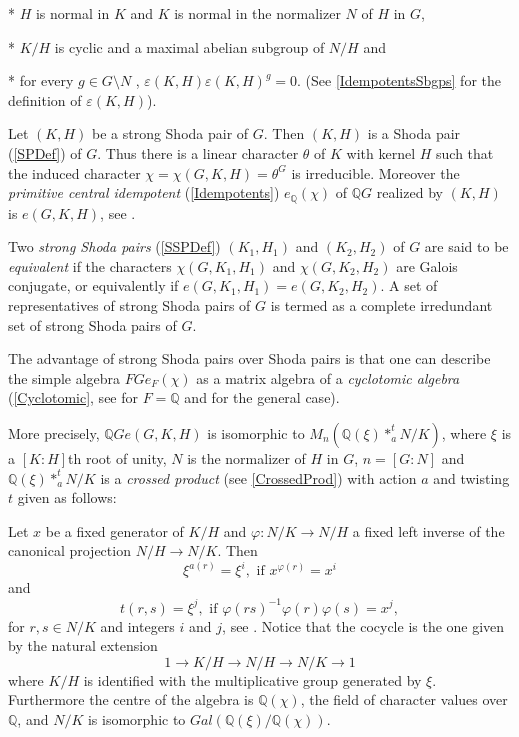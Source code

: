 \documentclass[a4paper,11pt]{report}
\begin{document}
{{ * $H$ is normal in $K$ and $K$ is normal in the normalizer $N$ of $H$ in $G$, 

 * $K/H$ is cyclic and a maximal abelian subgroup of $N/H$ and 

 * for every $g \in G\setminus N$ , $\varepsilon(K,H)\varepsilon(K,H)^g=0$. (See \ref{IdempotentsSbgps} for the definition of $\varepsilon(K,H)$). 

 Let $(K,H)$ be a strong Shoda pair of $G$. Then $(K,H)$ is a Shoda pair (\ref{SPDef}) of $G$. Thus there is a linear character $\theta$ of $K$ with kernel $H$ such that the induced character $\chi=\chi(G,K,H)=\theta^G$ is irreducible. Moreover the \emph{primitive central idempotent} (\ref{Idempotents}) $e_{{\ensuremath{\mathbb Q}} }(\chi)$ of ${\ensuremath{\mathbb Q}} G$ realized by $(K,H)$ is $e(G,K,H)$, see \cite{ORS}. 

  Two \emph{strong Shoda pairs} (\ref{SSPDef}) $(K_1,H_1)$ and $(K_2,H_2)$ of $G$ are said to be \emph{equivalent} if the characters $\chi(G,K_1,H_1)$ and $\chi(G,K_2,H_2)$ are Galois conjugate, or equivalently if $e(G,K_1,H_1)=e(G,K_2,H_2)$. A set of representatives of strong Shoda pairs of $G$ is termed as a complete irredundant set of strong Shoda pairs of $G$. 

 The advantage of strong Shoda pairs over Shoda pairs is that one can describe
the simple algebra $FGe_F(\chi)$ as a matrix algebra of a \emph{cyclotomic algebra} (\ref{Cyclotomic}, see \cite{ORS} for $F={\ensuremath{\mathbb Q}} $ and \cite{O} for the general case). 

 More precisely, ${\ensuremath{\mathbb Q}} Ge(G,K,H)$ is isomorphic to $M_n({\ensuremath{\mathbb Q}} (\xi)*_a^t N/K)$, where $\xi$ is a $[K:H]$\texttt{}th root of unity, $N$ is the normalizer of $H$ in $G$, $n=[G:N]$ and ${\ensuremath{\mathbb Q}} (\xi)*_a^t N/K$ is a \emph{crossed product} (see \ref{CrossedProd}) with action $a$ and twisting $t$ given as follows: 

 Let $x$ be a fixed generator of $K/H$ and $\varphi : N/K \rightarrow N/H$ a fixed left inverse of the canonical projection $N/H\rightarrow N/K$. Then 
\[ \xi^{a(r)} = \xi^i, \mbox{ if } x^{\varphi(r)}= x^i \]
 and 
\[ t(r,s) = \xi^j, \mbox{ if } \varphi(rs)^{-1} \varphi(r)\varphi(s) = x^j, \]
 for $r,s \in N/K$ and integers $i$ and $j$, see \cite{ORS}. Notice that the cocycle is the one given by the natural extension 
\[ 1 \rightarrow K/H \rightarrow N/H \rightarrow N/K \rightarrow 1 \]
 where $K/H$ is identified with the multiplicative group generated by $\xi$. Furthermore the centre of the algebra is ${\ensuremath{\mathbb Q}} (\chi)$, the field of character values over ${\ensuremath{\mathbb Q}} $, and $N/K$ is isomorphic to $Gal({\ensuremath{\mathbb Q}} (\xi)/{\ensuremath{\mathbb Q}} (\chi))$. 

}}
\end{document}
